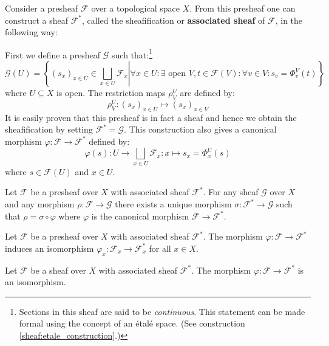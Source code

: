 	\begin{construct}[Sheafification]
		Consider a presheaf $\mathcal{F}$ over a topological space $X$. From this presheaf one can construct a sheaf $\mathcal{F}^\ast$, called the sheafification or \textbf{associated sheaf} of $\mathcal{F}$, in the following way:
		
		First we define a presheaf $\mathcal{G}$ such that:\footnote{Sections in this sheaf are said to be \textit{continuous}. This statement can be made formal using the concept of an \'etal\'e space. (See construction \ref{sheaf:etale_construction}.)}
		\begin{equation}
			\mathcal{G}(U) = \left\{\left.(s_x)_{x\in U}\in\bigsqcup_{x\in U}\mathcal{F}_x\right\vert\forall x\in U: \exists\text{ open }V, t\in\mathcal{F}(V): \forall v\in V: s_v = \Phi^V_v(t)\right\}
		\end{equation}
		where $U\subseteq X$ is open. The restriction maps $\rho^U_V$ are defined by:
		\begin{equation}
			\rho^U_V:(s_x)_{x\in U}\mapsto(s_x)_{x\in V}
		\end{equation}
		It is easily proven that this presheaf is in fact a sheaf and hence we obtain the sheafification by setting $\mathcal{F}^\ast = \mathcal{G}$. This construction also gives a canonical morphism $\varphi:\mathcal{F}\rightarrow\mathcal{F}^\ast$ defined by:
		\begin{equation}
			\varphi(s):U\rightarrow\bigsqcup_{x\in U}\mathcal{F}_x:x \mapsto s_x = \Phi^U_x(s)
		\end{equation}
		where $s\in\mathcal{F}(U)$ and $x\in U$.
	\end{construct}
	
	\begin{uproperty}
		Let $\mathcal{F}$ be a presheaf over $X$ with associated sheaf $\mathcal{F}^\ast$. For any sheaf $\mathcal{G}$ over $X$ and any morphism $\rho:\mathcal{F}\rightarrow\mathcal{G}$ there exists a unique morphism $\sigma:\mathcal{F}^\ast\rightarrow\mathcal{G}$ such that $\rho = \sigma\circ\varphi$ where $\varphi$ is the canonical morphism $\mathcal{F}\rightarrow\mathcal{F}^\ast$.
	\end{uproperty}
	
	\begin{property}
		Let $\mathcal{F}$ be a presheaf over $X$ with associated sheaf $\mathcal{F}^\ast$. The morphism $\varphi:\mathcal{F}\rightarrow\mathcal{F}^\ast$ induces an isomorphism $\varphi_x:\mathcal{F}_x\rightarrow\mathcal{F}^\ast_x$ for all $x\in X$.
	\end{property}
	\begin{property}
		Let $\mathcal{F}$ be a sheaf over $X$ with associated sheaf $\mathcal{F}^\ast$. The morphism $\varphi:\mathcal{F}\rightarrow\mathcal{F}^\ast$ is an isomorphism.
	\end{property}
	
